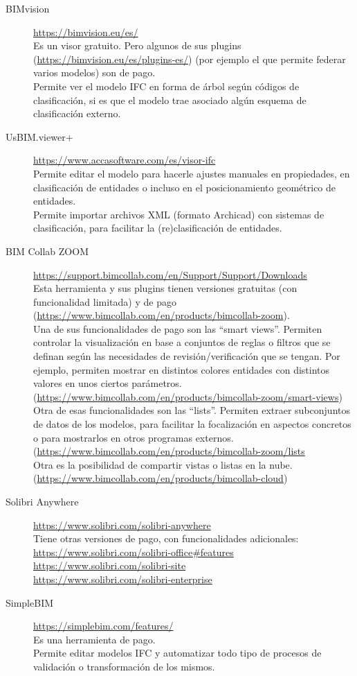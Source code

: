 \documentclass[spanish,12pt,a4paper,final,oneside]{book}
\begin{document}
\begin{description}
\item[BIMvision]
\url{https://bimvision.eu/es/}
\\Es un visor gratuito. Pero algunos de sus plugins (\url{https://bimvision.eu/es/plugins-es/}) (por ejemplo el que permite federar varios modelos) son de pago.
\\Permite ver el modelo IFC en forma de árbol según códigos de clasificación, si es que el modelo trae asociado algún esquema de clasificación externo.

\item[UsBIM.viewer+]
\url{https://www.accasoftware.com/es/visor-ifc}
\\Permite editar el modelo para hacerle ajustes manuales en propiedades, en clasificación de entidades o incluso en el posicionamiento geométrico de entidades.
\\Permite importar archivos XML (formato Archicad) con sistemas de clasificación, para facilitar la (re)clasificación de entidades.

\item[BIM Collab ZOOM]
\url{https://support.bimcollab.com/en/Support/Support/Downloads}
\\Esta herramienta y sus plugins tienen versiones gratuitas (con funcionalidad limitada) y de pago (\url{https://www.bimcollab.com/en/products/bimcollab-zoom}).
\\Una de sus funcionalidades de pago son las ``smart views''. Permiten controlar la visualización en base a conjuntos de reglas o filtros que se definan según las necesidades de revisión/verificación que se tengan. Por ejemplo, permiten mostrar en distintos colores entidades con distintos valores en unos ciertos parámetros. (\url{https://www.bimcollab.com/en/products/bimcollab-zoom/smart-views})
\\Otra de esas funcionalidades son las ``lists''. Permiten extraer subconjuntos de datos de los modelos, para facilitar la focalización en aspectos concretos o para mostrarlos en otros programas externos. (\url{https://www.bimcollab.com/en/products/bimcollab-zoom/lists}
\\Otra es la posibilidad de compartir vistas o listas en la nube. (\url{https://www.bimcollab.com/en/products/bimcollab-cloud}) 

\item[Solibri Anywhere]
\url{https://www.solibri.com/solibri-anywhere}
\\Tiene otras versiones de pago, con funcionalidades adicionales:
\\ \url{https://www.solibri.com/solibri-office#features}
\\ \url{https://www.solibri.com/solibri-site}
\\ \url{https://www.solibri.com/solibri-enterprise}

\item[SimpleBIM]
\url{https://simplebim.com/features/}
\\Es una herramienta de pago.
\\Permite editar modelos IFC y automatizar todo tipo de procesos de validación o transformación de los mismos.

\end{description}
\end{document}
